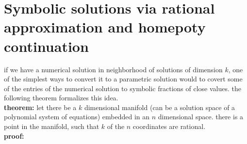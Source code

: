 \section*{Symbolic solutions via rational approximation and homepoty continuation}
if we have a numerical solution in neighborhood of solutions of dimension $k$, one of the simplest ways to convert it to a parametric solution would to covert some of the entries of the numerical solution to symbolic fractions of close values. the following theorem formalizes this idea.
\\\textbf{theorem:} let there be a $k$ dimensional manifold (can be a solution space of a polynomial system of equations) embedded in an $n$ dimensional space. there is a point in the manifold, such that $k$ of the $n$ coordinates are rational.
\\\textbf{proof:} 
